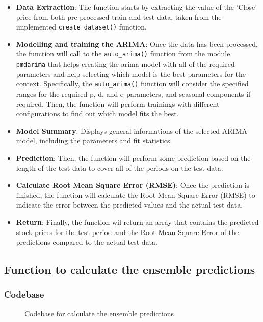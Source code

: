 \documentclass[11pt]{article}
\begin{document}
\begin{itemize}
    \item \textbf{Data Extraction}: The function starts by extracting the value of the 'Close' price from both pre-processed train and test data, taken from the implemented \texttt{create\_dataset()} function.
    \item \textbf{Modelling and training the ARIMA}: Once the data has been processed, the function will call to the \texttt{auto\_arima()} function from the module \texttt{pmdarima} that helps creating the arima model with all of the required parameters and help selecting which model is the best parameters for the context. Specifically, the \texttt{auto\_arima()} function will consider the specified ranges for the required p, d, and q parameters, and seasonal components if required. Then, the function will perform trainings with different configurations to find out which model fits the best.
    \item \textbf{Model Summary}: Displays general informations of the selected ARIMA model, including the parameters and fit statistics.
    \item \textbf{Prediction}: Then, the function will perform some prediction based on the length of the test data to cover all of the periods on the test data.
    \item \textbf{Calculate Root Mean Square Error (RMSE)}: Once the prediction is finished, the function will calculate the Root Mean Square Error (RMSE) to indicate the error between the predicted values and the actual test data.
    \item \textbf{Return}: Finally, the function wil return an array that contains the predicted stock prices for the test period and the Root Mean Square Error of the predictions compared to the actual test data.
\end{itemize}

\subsection{Function to calculate the ensemble predictions}

\subsubsection{Codebase}

\begin{figure}[ht]
    \centering
    \caption{Codebase for calculate the ensemble predictions}
    \label{fig:ensemble_predictions_code}
\end{figure}
\end{document}
